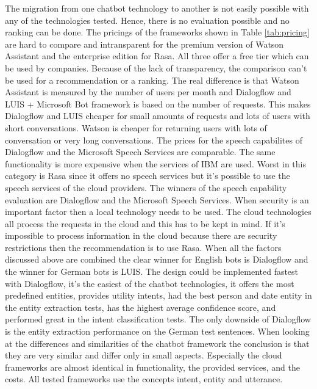 The migration from one chatbot technology to another is not easily possible with 
any of the technologies tested. 
Hence, there is no evaluation possible and no ranking can be done.
The pricings of the frameworks shown in Table \ref{tab:pricing} are hard to compare and intransparent for the premium version of Watson Assistant and the enterprise edition for Rasa.
All three offer a free tier which can be used by companies.
Because of the lack of transparency, the comparison can't be used for a recommendation or a ranking.
The real difference is that Watson Assistant is measured by the number of users per month and 
Dialogflow and LUIS + Microsoft Bot framework is based on the number of requests.
This makes Dialogflow and LUIS cheaper for small amounts of requests and lots of users with short conversations.
Watson is cheaper for returning users with lots of conversation or very long conversations.
The prices for the speech capabilites of Dialogflow and the Microsoft Speech Services are comparable.
The same functionality is more expensive when the services of IBM are used.
Worst in this category is Rasa since it offers no speech services but it's possible to use the 
speech services of the cloud providers.
The winners of the speech capability evaluation are Dialogflow and the Microsoft Speech Services.
When security is an important factor then a local technology needs to be used.
The cloud technologies all process the requests in the cloud and this has to be 
kept in mind.
If it's impossible to process information in the cloud because there are security restrictions
then the recommendation is to use Rasa.
When all the factors discussed above are combined the clear winner for English bots is Dialogflow and the 
winner for German bots is LUIS.
The design could be implemented fastest with Dialogflow, it's the easiest of the chatbot technologies,
it offers the most predefined entities, provides utility intents, had the best person and date
entity in the entity extraction tests, has the highest average confidence score, 
and performed great in the intent classification tests.
The only downside of Dialogflow is the entity extraction performance on the German test sentences.
When looking at the differences and similarities of the chatbot framework the conclusion is that 
they are very similar and differ only in small aspects.
Especially the cloud frameworks are almost identical in functionality, the provided services,
and the costs.
All tested frameworks use the concepts intent, entity and utterance.

